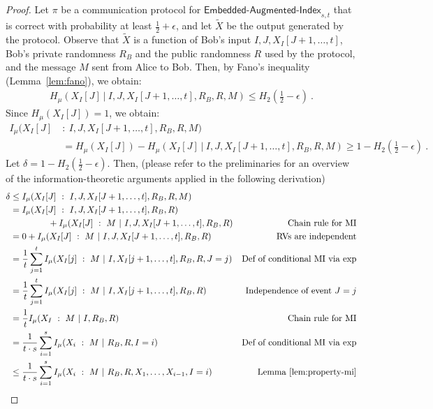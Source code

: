 \documentclass[11pt,a4paper]{article}
\begin{document}
\begin{proof}
    Let $\pi$ be a communication protocol for $\textsf{Embedded-Augmented-Index}_{s,t}$ that is correct with probability at least $\frac{1}{2} + \epsilon$, and let $\tilde{X}$ be the output generated by the protocol. Observe that $\tilde{X}$ is a function of Bob's input $I,J,X_I[J+1, \dots, t]$, Bob's private randomness $R_B$ and the public randomness $R$ used by the protocol, and the message $M$ sent from Alice to Bob. Then, by Fano's inequality (Lemma~\ref{lem:fano}), we obtain:
\begin{align*}
    H_{\mu}(X_I[J] \ | \ I,J,X_I[J+1, \dots, t], R_B, R, M) \le H_2(\frac{1}{2} - \epsilon) \ .     
\end{align*}
Since $H_{\mu}(X_I[J]) = 1$, we obtain:
\begin{align*}
    I_{\mu}(X_I[J] \ & : \ I,J,X_I[J+1, \dots, t], R_B, R, M)   \\
    & = H_{\mu}(X_I[J]) - H_{\mu}(X_I[J] \ | \ I,J,X_I[J+1, \dots, t], R_B, R, M) 
 \ge 1 - H_2(\frac{1}{2} - \epsilon) \ .     
\end{align*}
Let $\delta = 1 - H_2(\frac{1}{2} - \epsilon)$. Then, (please refer to the preliminaries for an overview of the information-theoretic arguments applied in the following derivation) 
\begin{align*}
  \delta & \le   I_{\mu}(X_I[J] \ : \ I,J,X_I[J+1, \dots, t], R_B, R, M) \\
  & = I_{\mu}(X_I[J] \ : \ I,J,X_I[J+1, \dots, t], R_B, R)  \\
  &  \hspace{1.5cm} + I_{\mu}(X_I[J] \ : \  M \ | \ I,J,X_I[J+1, \dots, t], R_B, R) & \text{Chain rule for MI} \\
  & = 0 + I_{\mu}(X_I[J] \ : \  M \ | \ I,J,X_I[J+1, \dots, t], R_B, R) & \mbox{RVs are independent} \\
  & = \frac{1}{t} \sum_{j = 1}^t I_{\mu}(X_I[j] \ : \  M \ | \ I,X_I[j+1, \dots, t], R_B, R, J=j) & \mbox{Def of conditional MI via exp} \\
  & = \frac{1}{t} \sum_{j = 1}^t I_{\mu}(X_I[j] \ : \  M \ | \ I,X_I[j+1, \dots, t], R_B, R) & \mbox{Independence of event $J=j$} \\
  & = \frac{1}{t} I_{\mu}(X_I \ : \  M \ | \ I, R_B, R) & \mbox{Chain rule for MI} \\
  & = \frac{1}{t \cdot s} \sum_{i=1}^s I_{\mu}(X_i \ : \  M \ | \ R_B, R, I = i) & \mbox{Def of conditional MI via exp} \\
  & \le \frac{1}{t \cdot s}  \sum_{i=1}^s I_{\mu}(X_i \ : \  M \ | \ R_B, R, X_1, \dots, X_{i-1}, I = i) & \mbox{Lemma~\ref{lem:property-mi}} \\

\end{align*}
\end{proof}
\end{document}
